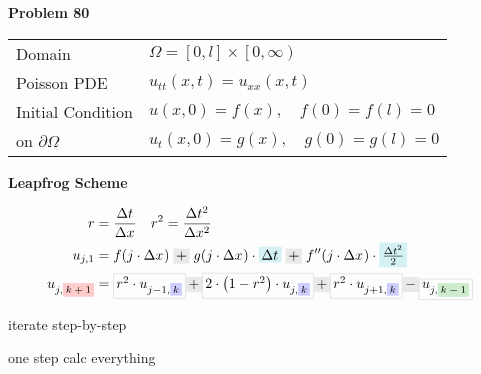 \documentclass[
    final,
    a4paper,
    oneside,
    parskip=full,
    headings=standardclasses,
    headings=big,
    pointednumbers,
    fleqn,
    numbers=noenddot
]{scrartcl}
\newcommand{\tfillt}[1]{\tfillc[#1][Turquoise!20][\normalsize]}
\newcommand{\tfillgr}[1]{\tfillc[#1][Gray!20][\normalsize]}
\newcommand{\tsfillb}[1]{\tfillc[#1][blue!20][\scriptsize]}
\newcommand{\tsfillg}[1]{\tfillc[#1][Green!20][\scriptsize]}
\newcommand{\tsfillr}[1]{\tfillc[#1][red!20][\scriptsize]}
\newcommand{\tdrawgr}[1]{\tdrawc[#1][Gray!40]}
\newcommand{\f}[2]{\frac{#1}{#2}}
\newcommand{\fs}[2]{{\tfrac{#1}{#2}}}
\newcommand{\kl}[1]{{\left( #1 \right)}}
\newcommand{\ks}[1]{{\left[ #1 \right]}}
\newcommand{\dom}{{\Omega}}
\newcommand{\bound}{{\partial \Omega}}
\begin{document}
    
    {\bf{Problem 80}} \\
    \renewcommand{\arraystretch}{1.25}
    \begin{tabular}{ll}
        Domain                  & $ \dom = \ks{0, l} \times \left[ 0, \infty \right) $ \\
        Poisson PDE             & $ u_{tt}\kl{x,t} = u_{xx}\kl{x,t} $ \\
        Initial Condition       & $ u\kl{x,0} = f\kl{x},     \quad f\kl{0} = f\kl{l} = 0$ \\
        on $\bound$             & $ u_{t}\kl{x,0} = g\kl{x}, \quad g\kl{0} = g\kl{l} = 0$ 
    \end{tabular}

    {\bf{Leapfrog Scheme}}


    \begin{minipage}{0.05\textwidth}
        \begin{align*}
             r & = \f{\dt}{\dx} \quad r^2 = \f{\dt[2]}{\dx[2]} \\
             u_{j,1} & = f\kl{j \cdot \dx}  \; \tfillgr{$+$} \; g\kl{j \cdot \dx} \cdot \tfillt{$\dt$} \; \tfillgr{$+$}  \; f''\kl{j \cdot \dx} \cdot \tfillt{$\fs{\dt[2]}{2}$} \\
             u_{j,\tsfillr{$k+1$}} & = \tdrawgr{$r^2 \cdot u_{j-1,\tsfillb{$k$}}$} \tfillgr{$+$}
                                       \tdrawgr{$2\cdot \kl{1 - r^2} \cdot u_{j,\tsfillb{$k$}}$} \tfillgr{$+$}
                                       \tdrawgr{$r^2 \cdot u_{j+1,\tsfillb{$k$}}$} \tfillgr{$-$}
                                       \tdrawgr{$u_{j,\tsfillg{$k-1$}}$}
        \end{align*}
    \end{minipage}

    iterate step-by-step

    one step calc everything
\end{document}
